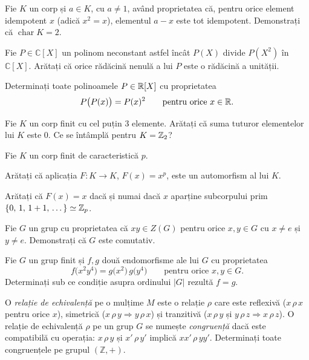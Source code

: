 \begin{problema}
Fie $K$ un corp și $a\in K$, cu $a\neq 1$, având proprietatea
că, pentru orice element idempotent $x$ (adică $x^{2}=x$), elementul
$a-x$ este tot idempotent. Demonstrați că $\operatorname{char}K=2$.
\end{problema}

\begin{problema}
Fie $P \in \mathbb{C}[X]$ un polinom neconstant astfel încât $P(X)$ divide $P(X^2)$ în $\mathbb{C}[X]$. Arătați că orice rădăcină nenulă a lui $P$ este o rădăcină a unității.
\end{problema}

\begin{problema}
Determinați toate polinoamele $P \in \mathbb{R}[X]$ cu proprietatea
\[
  P\bigl(P(x)\bigr) = P(x)^2 \qquad \text{pentru orice } x \in \mathbb{R}.
\]
\end{problema}

\begin{problema}[Clasică]
Fie $K$ un corp finit cu cel puțin 3 elemente. Arătați că suma tuturor elementelor lui $K$ este 0. Ce se întâmplă pentru $K = \mathbb{Z}_2$?
\end{problema}

\begin{problema}[Clasică]
Fie $K$ un corp finit de caracteristică $p$.
\begin{parti}
\item Arătați că aplicația $F : K \to K$, $F(x) = x^p$, este un automorfism al lui $K$.
\item Arătați că $F(x) = x$ dacă și numai dacă $x$ aparține subcorpului prim $\{0,\, 1,\, 1+1,\, \dots\} \simeq \mathbb{Z}_p$.
\end{parti}
\end{problema}

\begin{problema}
Fie $G$ un grup cu proprietatea că $xy \in Z(G)$ pentru orice
$x,y\in G$ cu $x\neq e$ și $y\neq e$. Demonstrați că $G$ este
comutativ.
\end{problema}

\begin{problema}
Fie $G$ un grup finit și $f,g$ două endomorfisme ale lui $G$ cu
proprietatea
\[
  f\bigl(x^{2}y^{4}\bigr) = g\bigl(x^{2}\bigr)\,g\bigl(y^{4}\bigr)
  \qquad \text{pentru orice } x,y\in G.
\]
Determinați sub ce condiție asupra ordinului $|G|$ rezultă
$f=g$.
\end{problema}

\begin{problema}
O \emph{relație de echivalență} pe o mulțime $M$ este o
relație $\rho$ care este reflexivă ($x\,\rho\,x$ pentru orice $x$),
simetrică ($x\,\rho\,y\Rightarrow y\,\rho\,x$) și tranzitivă
($x\,\rho\,y$ și $y\,\rho\,z\Rightarrow x\,\rho\,z$). O relație de
echivalență $\rho$ pe un grup $G$ se numește \emph{congruență}
dacă este compatibilă cu operația: $x\,\rho\,y$ și
$x'\,\rho\,y'$ implică $xx'\,\rho\,yy'$. Determinați toate
congruențele pe grupul $(\mathbb{Z},+)$.
\end{problema}

